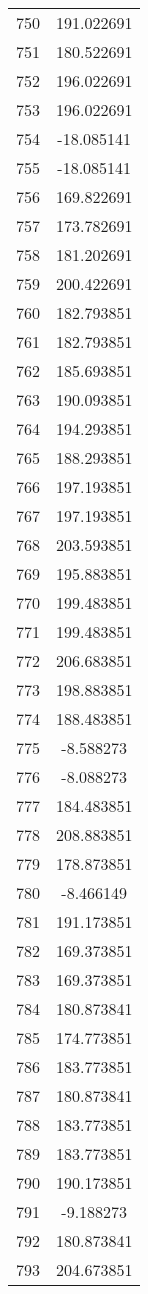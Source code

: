 \documentclass[12pt]{article}
\begin{document}
\begin{longtable}{@{}cc@{}}
750 & 191.022691 \\
751 & 180.522691 \\
752 & 196.022691 \\
753 & 196.022691 \\
754 & -18.085141 \\
755 & -18.085141 \\
756 & 169.822691 \\
757 & 173.782691 \\
758 & 181.202691 \\
759 & 200.422691 \\
760 & 182.793851 \\
761 & 182.793851 \\
762 & 185.693851 \\
763 & 190.093851 \\
764 & 194.293851 \\
765 & 188.293851 \\
766 & 197.193851 \\
767 & 197.193851 \\
768 & 203.593851 \\
769 & 195.883851 \\
770 & 199.483851 \\
771 & 199.483851 \\
772 & 206.683851 \\
773 & 198.883851 \\
774 & 188.483851 \\
775 & -8.588273 \\
776 & -8.088273 \\
777 & 184.483851 \\
778 & 208.883851 \\
779 & 178.873851 \\
780 & -8.466149 \\
781 & 191.173851 \\
782 & 169.373851 \\
783 & 169.373851 \\
784 & 180.873841 \\
785 & 174.773851 \\
786 & 183.773851 \\
787 & 180.873841 \\
788 & 183.773851 \\
789 & 183.773851 \\
790 & 190.173851 \\
791 & -9.188273 \\
792 & 180.873841 \\
793 & 204.673851 \\

\end{longtable}
\end{document}
